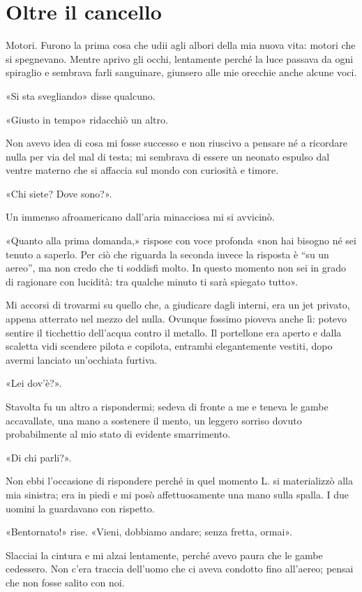 \chapter{Oltre il cancello}
\label{ch:oltre-il-cancello}

Motori. Furono la prima cosa che udii agli albori della mia nuova vita: motori che si spegnevano.
Mentre aprivo gli occhi, lentamente perché la luce passava da ogni spiraglio e sembrava farli
sanguinare, giunsero alle mie orecchie anche alcune voci.

«Si sta svegliando» disse qualcuno.

«Giusto in tempo» ridacchiò un altro.

Non avevo idea di cosa mi fosse successo e non riuscivo a pensare né a ricordare nulla per via del
mal di testa; mi sembrava di essere un neonato espulso dal ventre materno che si affaccia sul mondo
con curiosità e timore.

«Chi siete? Dove sono?».

Un immenso afroamericano dall'aria minacciosa mi si avvicinò.

«Quanto alla prima domanda,» rispose con voce profonda «non hai bisogno né sei tenuto a saperlo. Per
ciò che riguarda la seconda invece la risposta è ``su un aereo'', ma non credo che ti soddisfi
molto. In questo momento non sei in grado di ragionare con lucidità: tra qualche minuto ti sarà
spiegato tutto».

Mi accorsi di trovarmi su quello che, a giudicare dagli interni, era un jet privato, appena
atterrato nel mezzo del nulla. Ovunque fossimo pioveva anche lì: potevo sentire il ticchettio
dell'acqua contro il metallo. Il portellone era aperto e dalla scaletta vidi scendere pilota e
copilota, entrambi elegantemente vestiti, dopo avermi lanciato un'occhiata furtiva.

«Lei dov'è?».

Stavolta fu un altro a rispondermi; sedeva di fronte a me e teneva le gambe accavallate, una mano a
sostenere il mento, un leggero sorriso dovuto probabilmente al mio stato di evidente smarrimento.

«Di chi parli?».

Non ebbi l'occasione di rispondere perché in quel momento L. si materializzò alla mia sinistra; era
in piedi e mi posò affettuosamente una mano sulla spalla. I due uomini la guardavano con rispetto.

«Bentornato!» rise. «Vieni, dobbiamo andare; senza fretta, ormai».

Slacciai la cintura e mi alzai lentamente, perché avevo paura che le gambe cedessero. Non c'era
traccia dell'uomo che ci aveva condotto fino all'aereo; pensai che non fosse salito con noi.

